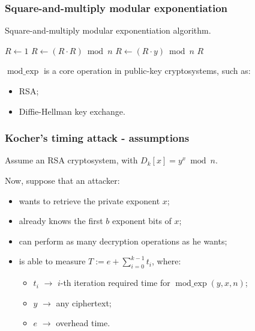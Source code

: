 \documentclass{beamer}
\DeclareMathOperator{\modexp}{mod\_exp}
\begin{document}
\begin{frame}
\frametitle{Square-and-multiply modular exponentiation}

\begin{algorithm}[H]
\caption{Square-and-multiply modular exponentiation algorithm.}\label{alg:one}
\begin{algorithmic}[1]
\Function{$\modexp$}{$y, x, n$}
  \State $R \leftarrow 1$\;
    \State $R \leftarrow (R \cdot R) \bmod n$\;
      \State $R \leftarrow (R \cdot y) \bmod n$\;
    \EndIf
  \EndFor
  \State \Return $R$
\EndFunction
\end{algorithmic}
\end{algorithm}

$\modexp$ is a core operation in public-key cryptosystems, such as:
\begin{itemize}
  \item RSA;
  \item Diffie-Hellman key exchange.
\end{itemize}

\end{frame}
\begin{frame}
\frametitle{Kocher's timing attack - assumptions}

Assume an RSA cryptosystem, with $D_k[x] = y^x \bmod n$.

Now, suppose that an attacker:

\begin{itemize}
  \item wants to retrieve the private exponent $x$;
  \item already knows the first $b$ exponent bits of $x$;
  \item can perform as many decryption operations as he wants;
  \item is able to measure $T := e + \sum_{i=0}^{k-1} t_i$, where:
  \begin{itemize}
    \item $t_i$ $\rightarrow$ $i$-th iteration required time for $\modexp(y, x, n)$;
    \item $y$ $\rightarrow$ any ciphertext;
    \item $e$ $\rightarrow$ overhead time.
  \end{itemize}
\end{itemize}

\end{frame}
\end{document}
